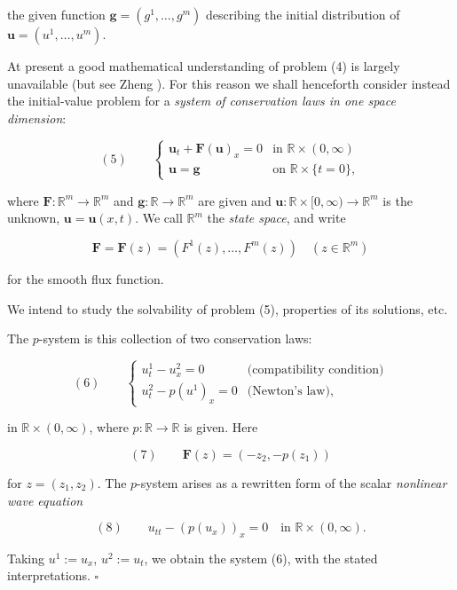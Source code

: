 the given function $\mathbf{g} = (g^1, \ldots, g^m)$ describing the initial distribution of $\mathbf{u} = (u^1, \ldots, u^m)$.

At present a good mathematical understanding of problem (4) is largely unavailable (but see Zheng \cite{Zheng2001}). For this reason we shall henceforth consider instead the initial-value problem for a \textit{system of conservation laws in one space dimension}:

$$(5) \qquad \begin{cases} \mathbf{u}_t + \mathbf{F}(\mathbf{u})_x = 0 & \text{in } \mathbb{R} \times (0, \infty) \\ \mathbf{u} = \mathbf{g} & \text{on } \mathbb{R} \times \{t = 0\}, \end{cases}$$

where $\mathbf{F}: \mathbb{R}^m \to \mathbb{R}^m$ and $\mathbf{g}: \mathbb{R} \to \mathbb{R}^m$ are given and $\mathbf{u}: \mathbb{R} \times [0, \infty) \to \mathbb{R}^m$ is the unknown, $\mathbf{u} = \mathbf{u}(x,t)$. We call $\mathbb{R}^m$ the \textit{state space}, and write

$$\mathbf{F} = \mathbf{F}(z) = (F^1(z), \ldots, F^m(z)) \quad (z \in \mathbb{R}^m)$$

for the smooth flux function.

We intend to study the solvability of problem (5), properties of its solutions, etc.

\begin{example}
\label{ex:p-system-definition}
The $p$-system is this collection of two conservation laws:

$$(6) \qquad \begin{cases} u^1_t - u^2_x = 0 & \text{(compatibility condition)} \\ u^2_t - p(u^1)_x = 0 & \text{(Newton's law)}, \end{cases}$$

in $\mathbb{R}\times(0,\infty)$, where $p:\mathbb{R}\to\mathbb{R}$ is given. Here

$$(7) \qquad \mathbf{F}(z) = (-z_2, -p(z_1))$$

for $z=(z_1,z_2)$. The $p$-system arises as a rewritten form of the scalar \textit{nonlinear wave equation}

$$(8) \qquad u_{tt} - (p(u_x))_x = 0 \quad \text{in } \mathbb{R}\times(0,\infty).$$

Taking $u^1 := u_x$, $u^2 := u_t$, we obtain the system (6), with the stated interpretations. $\square$
\end{example}

